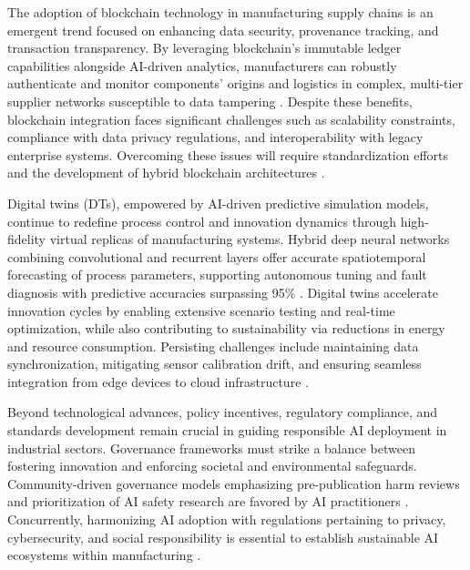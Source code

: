 \documentclass[sigconf]{acmart}
\begin{document}
The adoption of blockchain technology in manufacturing supply chains is an emergent trend focused on enhancing data security, provenance tracking, and transaction transparency. By leveraging blockchain’s immutable ledger capabilities alongside AI-driven analytics, manufacturers can robustly authenticate and monitor components’ origins and logistics in complex, multi-tier supplier networks susceptible to data tampering \cite{ref25}. Despite these benefits, blockchain integration faces significant challenges such as scalability constraints, compliance with data privacy regulations, and interoperability with legacy enterprise systems. Overcoming these issues will require standardization efforts and the development of hybrid blockchain architectures \cite{ref41}.

Digital twins (DTs), empowered by AI-driven predictive simulation models, continue to redefine process control and innovation dynamics through high-fidelity virtual replicas of manufacturing systems. Hybrid deep neural networks combining convolutional and recurrent layers offer accurate spatiotemporal forecasting of process parameters, supporting autonomous tuning and fault diagnosis with predictive accuracies surpassing 95\% \cite{ref26}. Digital twins accelerate innovation cycles by enabling extensive scenario testing and real-time optimization, while also contributing to sustainability via reductions in energy and resource consumption. Persisting challenges include maintaining data synchronization, mitigating sensor calibration drift, and ensuring seamless integration from edge devices to cloud infrastructure \cite{ref26,ref38}.

Beyond technological advances, policy incentives, regulatory compliance, and standards development remain crucial in guiding responsible AI deployment in industrial sectors. Governance frameworks must strike a balance between fostering innovation and enforcing societal and environmental safeguards. Community-driven governance models emphasizing pre-publication harm reviews and prioritization of AI safety research are favored by AI practitioners \cite{ref45}. Concurrently, harmonizing AI adoption with regulations pertaining to privacy, cybersecurity, and social responsibility is essential to establish sustainable AI ecosystems within manufacturing \cite{ref44}.
\end{document}
